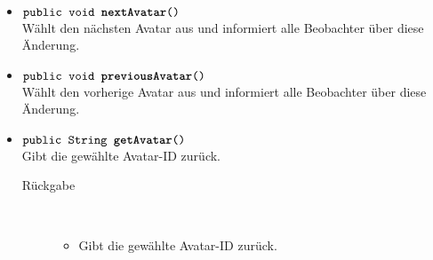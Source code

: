 \begin{description}
\begin{itemize}
		\item $\texttt{public void \textbf{nextAvatar}()}$ \\ Wählt den nächsten Avatar aus und informiert alle Beobachter über diese Änderung.
		
		\item $\texttt{public void \textbf{previousAvatar}()}$ \\ Wählt den vorherige Avatar aus und informiert alle Beobachter über diese Änderung.
		
		\item $\texttt{public String \textbf{getAvatar}()}$ \\ Gibt die gewählte Avatar-ID zurück.
		\begin{description}
			\item[Rückgabe] \hfill \\
			\vspace{-.8cm}
			\begin{itemize}
				\item Gibt die gewählte Avatar-ID zurück.
			\end{itemize}
		\end{description}
	\end{itemize}
\end{description}